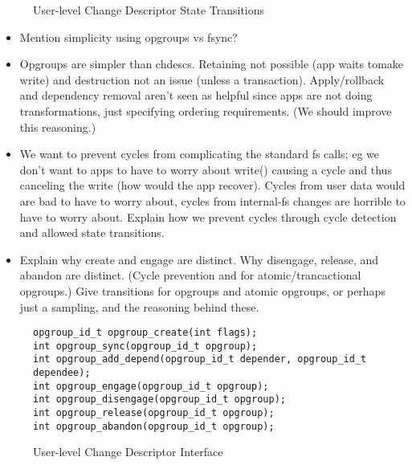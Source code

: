 \begin{figure}[htb]
\caption{\label{fig:opgroup-transitions} User-level Change Descriptor State Transitions}
\end{figure}

\begin{itemize}
\item Mention simplicity using opgroups vs fsync?
\item Opgroups are simpler than chdescs. Retaining not possible (app
  waits tomake write) and destruction not an issue (unless a
  transaction). Apply/rollback and dependency removal aren't seen as
  helpful since apps are not doing transformations, just specifying
  ordering requirements. (We should improve this reasoning.)
\item We want to prevent cycles from complicating the standard fs
  calls; eg we don't want to apps to have to worry about write()
  causing a cycle and thus canceling the write (how would the app
  recover). Cycles from user data would are bad to have to worry
  about, cycles from internal-fs changes are horrible to have to
  worry about. Explain how we prevent cycles through cycle detection
  and allowed state transitions.
\item Explain why create and engage are distinct. Why disengage,
  release, and abandon are distinct. (Cycle prevention and for
  atomic/trancactional opgroups.) Give transitions for opgroups and
  atomic opgroups, or perhaps just a sampling, and the reasoning
  behind these.
\end{itemize}

\begin{figure}[htb]
\begin{scriptsize}
\texttt{opgroup\_id\_t opgroup\_create(int flags);}\\
\texttt{int opgroup\_sync(opgroup\_id\_t opgroup);}\\
\texttt{int opgroup\_add\_depend(opgroup\_id\_t depender, opgroup\_id\_t dependee);}\\
\texttt{int opgroup\_engage(opgroup\_id\_t opgroup);}\\
\texttt{int opgroup\_disengage(opgroup\_id\_t opgroup);}\\
\texttt{int opgroup\_release(opgroup\_id\_t opgroup);}\\
\texttt{int opgroup\_abandon(opgroup\_id\_t opgroup);}
\end{scriptsize}
\caption{\label{fig:opgroup-interface} User-level Change Descriptor Interface}
\end{figure}

